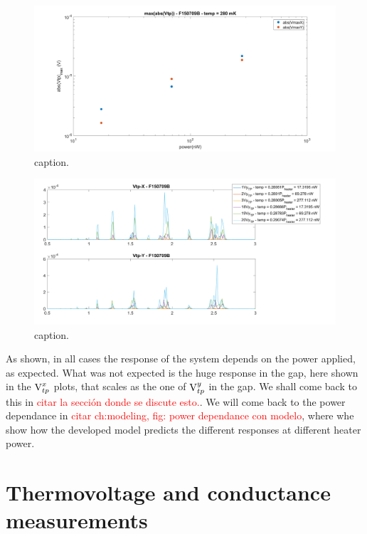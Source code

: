 \begin{figure}
    \includegraphics[width=1\textwidth]{figures/experimental/powerDependance/F150709B-cambio-potencia-01.png}
    \caption{caption.}
    \label{fig:F150709B_power_01}
\end{figure}

\begin{figure}
    \includegraphics[width=1\textwidth]{figures/experimental/powerDependance/F150709B-cambio-potencia-02.png}
    \caption{caption.}
    \label{fig:F150709B_power_02}
\end{figure}

As shown, in all cases the response of the system depends on the power applied, as expected. What was not expected is the huge response in the gap, here shown in the \( \text{V}_{tp}^x \) plots, that scales as the one of \( \text{V}_{tp}^y \) in the gap. We shall come back to this in \textcolor{red}{citar la sección donde se discute esto.}. We will come back to the power dependance in \textcolor{red}{citar ch:modeling, fig: power dependance con modelo}, where whe show how the developed model predicts the different responses at different heater power.


\section{Thermovoltage and conductance measurements}

